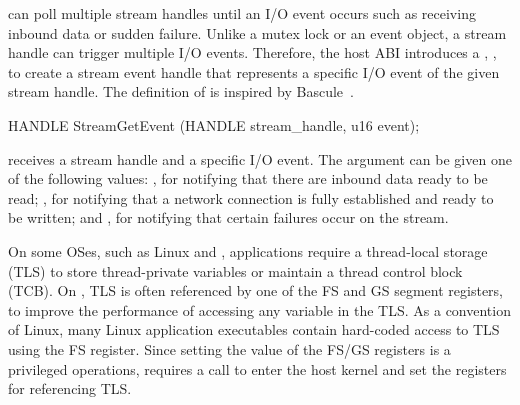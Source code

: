  can poll multiple stream handles until an I/O event occurs
such as receiving inbound data or sudden failure.
Unlike a mutex lock or an event object, a stream handle can trigger multiple I/O events.
Therefore, the host ABI introduces a \hostapi{}, , to create a stream event handle
that represents a specific I/O event of the given stream handle.
The definition of  is inspired by Bascule~\cite{baumann13bascule}.


\begin{paldef}
HANDLE StreamGetEvent (HANDLE stream_handle, u16 event);
\end{paldef}


 receives a stream handle and a specific I/O event.
The  argument can be given
one of the following values:
, for notifying that there are inbound data ready to be read;
, for notifying
that a network connection is fully established
and ready to be written;
and , for notifying that certain failures occur on the stream.





On some OSes, such as Linux and \win{}, applications require a thread-local storage (TLS)
to store thread-private variables or maintain a thread control block (TCB).
On \graphenearch{},
TLS is often referenced by one of the FS and GS segment registers,
to improve the performance of accessing any variable in the TLS.
As a convention of Linux, many Linux application executables
contain hard-coded access to TLS
using the FS register.
Since setting the value of the FS/GS registers is a privileged operations,
\thehostabi{} requires a call to enter the host kernel
and set the registers for referencing TLS.


